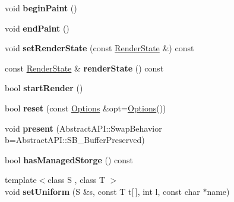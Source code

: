 \begin{DoxyCompactItemize}
\item 
\hypertarget{class_tempest_1_1_device_a55c52d93576f1cac0fcbf8ffeca777d5}{void {\bfseries begin\+Paint} ()}\label{class_tempest_1_1_device_a55c52d93576f1cac0fcbf8ffeca777d5}

\item 
\hypertarget{class_tempest_1_1_device_aa577d24ba60cc207aea9e42c9c9a29da}{void {\bfseries end\+Paint} ()}\label{class_tempest_1_1_device_aa577d24ba60cc207aea9e42c9c9a29da}

\item 
\hypertarget{class_tempest_1_1_device_a382944df2d75aef815771a0f908c592f}{void {\bfseries set\+Render\+State} (const \hyperlink{class_tempest_1_1_render_state}{Render\+State} \&) const }\label{class_tempest_1_1_device_a382944df2d75aef815771a0f908c592f}

\item 
\hypertarget{class_tempest_1_1_device_a0029074fd9255d8478cbca4bfaf4b96a}{const \hyperlink{class_tempest_1_1_render_state}{Render\+State} \& {\bfseries render\+State} () const }\label{class_tempest_1_1_device_a0029074fd9255d8478cbca4bfaf4b96a}

\item 
\hypertarget{class_tempest_1_1_device_ab9a827324bfcf2b10285dcfb965f18f8}{bool {\bfseries start\+Render} ()}\label{class_tempest_1_1_device_ab9a827324bfcf2b10285dcfb965f18f8}

\item 
\hypertarget{class_tempest_1_1_device_ac9d21709011b87e3e09f891c601ad138}{bool {\bfseries reset} (const \hyperlink{struct_tempest_1_1_abstract_a_p_i_1_1_options}{Options} \&opt=\hyperlink{struct_tempest_1_1_abstract_a_p_i_1_1_options}{Options}())}\label{class_tempest_1_1_device_ac9d21709011b87e3e09f891c601ad138}

\item 
\hypertarget{class_tempest_1_1_device_a424656bbc73a23c02ab99bfd3eddefc8}{void {\bfseries present} (Abstract\+A\+P\+I\+::\+Swap\+Behavior b=Abstract\+A\+P\+I\+::\+S\+B\+\_\+\+Buffer\+Preserved)}\label{class_tempest_1_1_device_a424656bbc73a23c02ab99bfd3eddefc8}

\item 
\hypertarget{class_tempest_1_1_device_a4a11bf36b94c3c5d9a515a13dc421048}{bool {\bfseries has\+Managed\+Storge} () const }\label{class_tempest_1_1_device_a4a11bf36b94c3c5d9a515a13dc421048}

\item 
\hypertarget{class_tempest_1_1_device_ad93ae37889695ecd46902047df8a8258}{{\footnotesize template$<$class S , class T $>$ }\\void {\bfseries set\+Uniform} (S \&s, const T t\mbox{[}$\,$\mbox{]}, int l, const char $\ast$name)}\label{class_tempest_1_1_device_ad93ae37889695ecd46902047df8a8258}


\end{DoxyCompactItemize}
